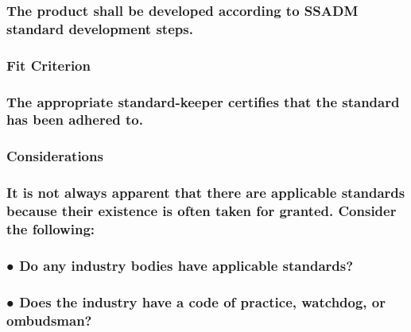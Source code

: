 \documentclass[
]{article}
\begin{document}
\hypertarget{the-product-shall-be-developed-according-to-ssadm-standard-development-steps.}{%
\subsubsection{The product shall be developed according to SSADM
standard development
steps.}\label{the-product-shall-be-developed-according-to-ssadm-standard-development-steps.}}

\hypertarget{fit-criterion-13}{%
\subsubsection{Fit Criterion}\label{fit-criterion-13}}

\hypertarget{the-appropriate-standard-keeper-certifies-that-the-standard-has-been-adhered-to.}{%
\subsubsection{The appropriate standard-keeper certifies that the
standard has been adhered
to.}\label{the-appropriate-standard-keeper-certifies-that-the-standard-has-been-adhered-to.}}

\hypertarget{considerations-43}{%
\subsubsection{Considerations}\label{considerations-43}}

\hypertarget{it-is-not-always-apparent-that-there-are-applicable-standards-because-their-existence-is-often-taken-for-granted.-consider-the-following}{%
\subsubsection{It is not always apparent that there are applicable
standards because their existence is often taken for granted. Consider
the
following:}\label{it-is-not-always-apparent-that-there-are-applicable-standards-because-their-existence-is-often-taken-for-granted.-consider-the-following}}

\hypertarget{do-any-industry-bodies-have-applicable-standards}{%
\subsubsection{● Do any industry bodies have applicable
standards?}\label{do-any-industry-bodies-have-applicable-standards}}

\hypertarget{does-the-industry-have-a-code-of-practice-watchdog-or-ombudsman}{%
\subsubsection{● Does the industry have a code of practice, watchdog, or
ombudsman?}\label{does-the-industry-have-a-code-of-practice-watchdog-or-ombudsman}}
\end{document}
